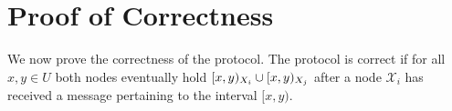 %
%
%	
%
%
%

\section{Proof of Correctness}
\label{set-reconciliation-simple-correct}

\newcommand{\intcount}[1]{\mathit{count}_{#1}}

We now prove the correctness of the protocol. The protocol is correct if for all $x, y \in U$ both nodes eventually hold $[{x},{y})_{X_i} \cup [{x},{y})_{X_j}$ after a node $\mathcal{X}_i$ has received a message pertaining to the interval $[x, y)$.

